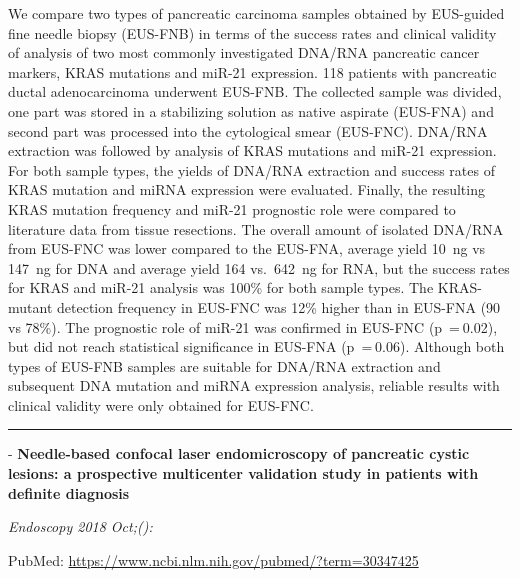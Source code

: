 \documentclass[]{article}
\begin{document}
We compare two types of pancreatic carcinoma samples obtained by
EUS-guided fine needle biopsy (EUS-FNB) in terms of the success rates
and clinical validity of analysis of two most commonly investigated
DNA/RNA pancreatic cancer markers, KRAS mutations and miR-21 expression.
118 patients with pancreatic ductal adenocarcinoma underwent EUS-FNB.
The collected sample was divided, one part was stored in a stabilizing
solution as native aspirate (EUS-FNA) and second part was processed into
the cytological smear (EUS-FNC). DNA/RNA extraction was followed by
analysis of KRAS mutations and miR-21 expression. For both sample types,
the yields of DNA/RNA extraction and success rates of KRAS mutation and
miRNA expression were evaluated. Finally, the resulting KRAS mutation
frequency and miR-21 prognostic role were compared to literature data
from tissue resections. The overall amount of isolated DNA/RNA from
EUS-FNC was lower compared to the EUS-FNA, average yield 10~ng vs 147~ng
for DNA and average yield 164 vs.~642~ng for RNA, but the success rates
for KRAS and miR-21 analysis was 100\% for both sample types. The
KRAS-mutant detection frequency in EUS-FNC was 12\% higher than in
EUS-FNA (90 vs 78\%). The prognostic role of miR-21 was confirmed in
EUS-FNC (p~= 0.02), but did not reach statistical significance in
EUS-FNA (p~= 0.06). Although both types of EUS-FNB samples are suitable
for DNA/RNA extraction and subsequent DNA mutation and miRNA expression
analysis, reliable results with clinical validity were only obtained for
EUS-FNC.

{}

{}

\begin{center}\rule{0.5\linewidth}{\linethickness}\end{center}

 - \textbf{Needle-based confocal laser endomicroscopy of pancreatic
cystic lesions: a prospective multicenter validation study in patients
with definite diagnosis}

\emph{Endoscopy 2018 Oct;():}

PubMed: \url{https://www.ncbi.nlm.nih.gov/pubmed/?term=30347425}
\end{document}
